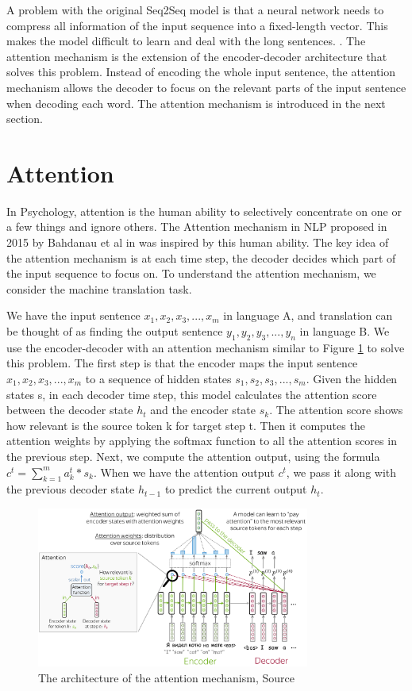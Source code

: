 A problem with the original Seq2Seq model is that a neural network needs to compress all information of the input sequence into a fixed-length vector. This makes the model difficult to learn and deal with the long sentences. \cite{bahdanau2016neural}. The attention mechanism is the extension of the encoder-decoder architecture that solves this problem. Instead of encoding the whole input sentence, the attention mechanism allows the decoder to focus on the relevant parts of the input sentence when decoding each word. The attention mechanism is introduced in the next section.

\section{Attention}
In Psychology, attention is the human ability to selectively concentrate on one or a few things and ignore others. The Attention mechanism in NLP proposed in 2015 by Bahdanau et al in \cite{bahdanau2016neural} was inspired by this human ability. The key idea of the attention mechanism is at each time step, the decoder decides which part of the input sequence to focus on. To understand the attention mechanism, we consider the machine translation task.

We have the input sentence $x_1, x_2, x_3, ..., x_m$ in language A, and translation can be thought of as finding the output sentence $y_1, y_2, y_3, ..., y_n$ in language B. We use the encoder-decoder with an attention mechanism similar to Figure \ref{fig:attention_architecture} to solve this problem. The first step is that the encoder maps the input sentence $x_1, x_2, x_3, ..., x_m$ to a sequence of hidden states $s_1, s_2, s_3, ..., s_m$. Given the hidden states s, in each decoder time step, this model calculates the attention score between the decoder state $h_t$ and the encoder state $s_k$. The attention score shows how relevant is the source token k for target step t. Then it computes the attention weights by applying the softmax function to all the attention scores in the previous step. Next, we compute the attention output, using the formula $c^t = \sum_{k=1}^m a_k^t*s_k$. When we have the attention output $c^t$, we pass it along with the previous decoder state $h_{t-1}$ to predict the current output $h_t$. 

\begin{figure}[ht]
    \centering
    \includegraphics[width=0.8\textwidth]{Images/5.Theoretical_Background/attention_architecture.png}
    \caption{The architecture of the attention mechanism, Source \cite{voita2020nlpCourse}}
    \label{fig:attention_architecture}
\end{figure}

